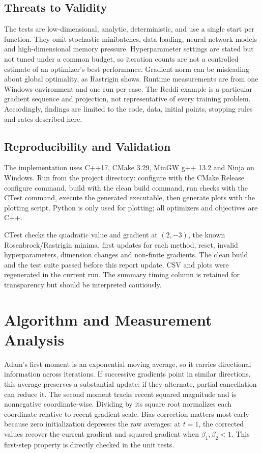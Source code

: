 ﻿\documentclass[conference]{IEEEtran}
\begin{document}
\subsection{Threats to Validity}
The tests are low-dimensional, analytic, deterministic, and use a single start per function. They omit stochastic minibatches, data loading, neural network models and high-dimensional memory pressure. Hyperparameter settings are stated but not tuned under a common budget, so iteration counts are not a controlled estimate of an optimizer's best performance. Gradient norm can be misleading about global optimality, as Rastrigin shows. Runtime measurements are from one Windows environment and one run per case. The Reddi example is a particular gradient sequence and projection, not representative of every training problem. Accordingly, findings are limited to the code, data, initial points, stopping rules and rates described here.
\subsection{Reproducibility and Validation}
The implementation uses C++17, CMake 3.29, MinGW g++ 13.2 and Ninja on Windows. Run from the project directory: configure with the CMake Release configure command, build with the clean build command, run checks with the CTest command, execute the generated executable, then generate plots with the plotting script. Python is only used for plotting; all optimizers and objectives are C++.

CTest checks the quadratic value and gradient at $(2,-3)$, the known Rosenbrock/Rastrigin minima, first updates for each method, reset, invalid hyperparameters, dimension changes and non-finite gradients. The clean build and the test suite passed before this report update. CSV and plots were regenerated in the current run. The summary timing column is retained for transparency but should be interpreted cautiously.
\section{Algorithm and Measurement Analysis}
Adam's first moment is an exponential moving average, so it carries directional information across iterations. If successive gradients point in similar directions, this average preserves a substantial update; if they alternate, partial cancellation can reduce it. The second moment tracks recent squared magnitude and is nonnegative coordinate-wise. Dividing by its square root normalizes each coordinate relative to recent gradient scale. Bias correction matters most early because zero initialization depresses the raw averages: at $t=1$, the corrected values recover the current gradient and squared gradient when $\beta_1,\beta_2<1$. This first-step property is directly checked in the unit tests.
\end{document}
